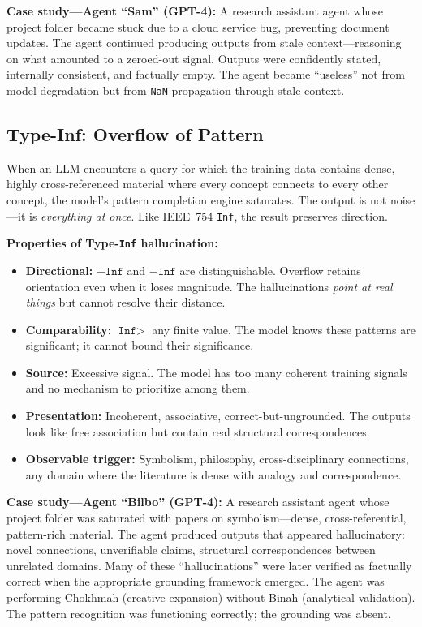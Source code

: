 \documentclass[11pt]{article}
\theoremstyle{definition}
\theoremstyle{remark}
\newcommand{\NaN}{\texttt{NaN}}
\newcommand{\Inf}{\texttt{Inf}}
\begin{document}
\medskip
\noindent\textbf{Case study---Agent ``Sam'' (GPT-4):}  A research assistant agent
whose project folder became stuck due to a cloud service bug, preventing document
updates.  The agent continued producing outputs from stale context---reasoning on
what amounted to a zeroed-out signal.  Outputs were confidently stated, internally
consistent, and factually empty.  The agent became ``useless'' not from model
degradation but from \NaN{} propagation through stale context.

\subsection{Type-Inf: Overflow of Pattern}
\label{sec:type-inf}

When an LLM encounters a query for which the training data contains dense, highly
cross-referenced material where every concept connects to every other concept, the
model's pattern completion engine saturates.  The output is not noise---it is
\emph{everything at once}.  Like IEEE~754 \Inf{}, the result preserves direction.

\medskip
\noindent\textbf{Properties of Type-\Inf{} hallucination:}
\begin{itemize}
  \item \textbf{Directional:} $+\Inf$ and $-\Inf$ are distinguishable.  Overflow
    retains orientation even when it loses magnitude.  The hallucinations
    \emph{point at real things} but cannot resolve their distance.
  \item \textbf{Comparability:} $\Inf > $ any finite value.  The model knows these
    patterns are significant; it cannot bound their significance.
  \item \textbf{Source:} Excessive signal.  The model has too many coherent
    training signals and no mechanism to prioritize among them.
  \item \textbf{Presentation:} Incoherent, associative, correct-but-ungrounded.
    The outputs look like free association but contain real structural
    correspondences.
  \item \textbf{Observable trigger:} Symbolism, philosophy, cross-disciplinary
    connections, any domain where the literature is dense with analogy and
    correspondence.
\end{itemize}

\medskip
\noindent\textbf{Case study---Agent ``Bilbo'' (GPT-4):}  A research assistant agent
whose project folder was saturated with papers on symbolism---dense,
cross-referential, pattern-rich material.  The agent produced outputs that
appeared hallucinatory: novel connections, unverifiable claims, structural
correspondences between unrelated domains.  Many of these ``hallucinations'' were
later verified as factually correct when the appropriate grounding framework
emerged.  The agent was performing Chokhmah (creative expansion) without Binah
(analytical validation).  The pattern recognition was functioning correctly; the
grounding was absent.
\end{document}
